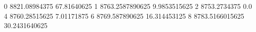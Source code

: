0 8821.08984375 67.81640625
1 8763.2587890625 9.9853515625
2 8753.2734375 0.0
4 8760.28515625 7.01171875
6 8769.587890625 16.314453125
8 8783.5166015625 30.2431640625
